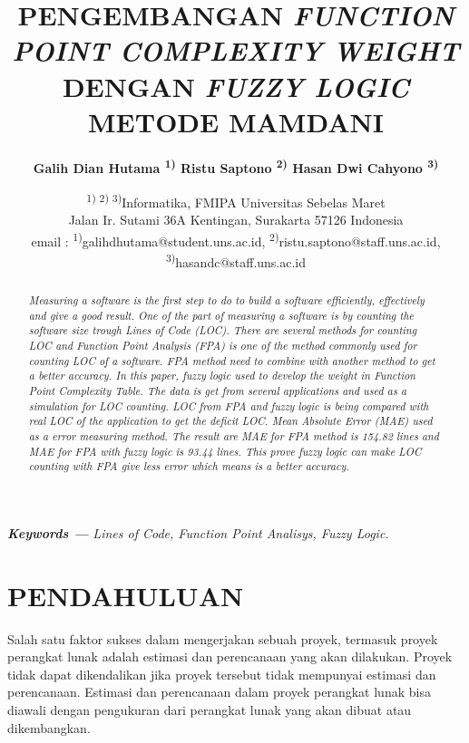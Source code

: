 \documentclass[a4paper]{article}
\title{\textbf{PENGEMBANGAN \textit{FUNCTION POINT COMPLEXITY WEIGHT} DENGAN \textit{FUZZY LOGIC} METODE MAMDANI}}
\author{\textbf{Galih Dian Hutama \textsuperscript{1)} Ristu Saptono \textsuperscript{2)} Hasan Dwi Cahyono \textsuperscript{3)}}}
\date{\textsuperscript{1) 2) 3)}Informatika, FMIPA Universitas Sebelas Maret\\ Jalan Ir. Sutami 36A Kentingan, Surakarta 57126 Indonesia\\ email : \textsuperscript{1)}galihdhutama@student.uns.ac.id, \textsuperscript{2)}ristu.saptono@staff.uns.ac.id, \textsuperscript{3)}hasandc@staff.uns.ac.id}
\providecommand{\keywords}[1]
{
  \small	
  \textbf{\textit{Keywords ---}} #1
}
\begin{document}
\maketitle

\begin{multicols}{2}

\begin{abstract}
    \textit{Measuring a software is the first step to do to build a software efficiently, effectively and give a good result. One of the part of measuring a software is by counting the software size trough Lines of Code (LOC). There are several methods for counting LOC and Function Point Analysis (FPA) is one of the method commonly used for counting LOC of a software. FPA method need to combine with another method to get a better accuracy. In this paper, fuzzy logic used to develop the weight in Function Point Complexity Table. The data is get from several applications and used as a simulation for LOC counting. LOC from FPA and fuzzy logic is being compared with real LOC of the application to get the deficit LOC. Mean Absolute Error (MAE) used as a error measuring method. The result are MAE for FPA method is 154.82 lines and MAE for FPA with fuzzy logic is 93.44 lines. This prove fuzzy logic can make LOC counting with FPA give less error which means is a better accuracy.}
\end{abstract}

\keywords{\textit{Lines of Code, Function Point Analisys, Fuzzy Logic.}}

\section{PENDAHULUAN}

\par Salah satu faktor sukses dalam mengerjakan sebuah proyek, termasuk proyek perangkat lunak adalah estimasi dan perencanaan yang akan dilakukan. Proyek tidak dapat dikendalikan jika proyek tersebut tidak mempunyai estimasi dan perencanaan. Estimasi dan perencanaan dalam proyek perangkat lunak bisa diawali dengan pengukuran dari perangkat lunak yang akan dibuat atau dikembangkan. \citep{Tunali2014}


\end{multicols}
\end{document}
